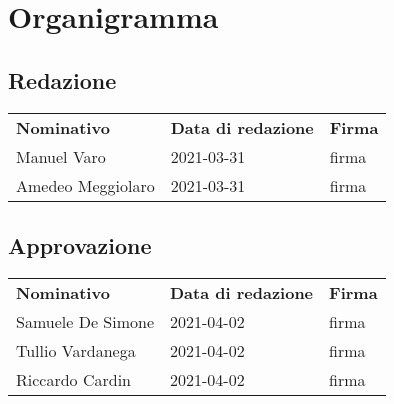 \section{Organigramma}
    \subsection{Redazione}
        \begin{center}
            \begin{table}[h!]
                \centering
                \renewcommand{\arraystretch}{1.8}
                \begin{tabular}{p{150px} p{110px} p{110px}}
                    \rowcolor{logo!70} \textbf{Nominativo} & \textbf{Data di redazione} & \textbf{Firma}\\
                    Manuel Varo & 2021-03-31 & firma \\
                    Amedeo Meggiolaro & 2021-03-31 & firma \\
                \end{tabular}
            \end{table}
        \end{center}
    \subsection{Approvazione}
        \begin{center}
            \begin{table}[h!]
                \centering
                \renewcommand{\arraystretch}{1.8}
                \begin{tabular}{p{150px} p{110px} p{110px}}
                    \rowcolor{logo!70} \textbf{Nominativo} & \textbf{Data di redazione} & \textbf{Firma}\\
                    Samuele De Simone & 2021-04-02 & firma \\
                    Tullio Vardanega & 2021-04-02 & firma \\
                    Riccardo Cardin & 2021-04-02 & firma \\
                \end{tabular}
            \end{table}
        \end{center}
        \pagebreak
